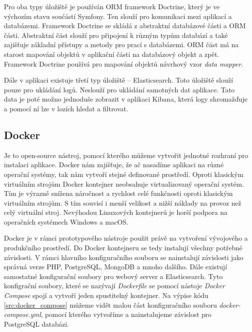 \documentclass[czech,master]{diploma}
\begin{document}
Pro oba typy úložiště je používán ORM framework Doctrine, který je ve výchozím stavu součástí Symfony. Ten slouží pro komunikaci mezi aplikací a databázemi. Framework Doctrine se skládá z abstraktní databázové části  a ORM části. Abstraktní část slouží pro připojení k různým typům databází a také zajišťuje základní přístupy a metody pro prací s databázemi. ORM část má na starost mapování objektů v aplikační části na databázový objekt a zpět. Framework Doctrine používá pro mapování objektů návrhový vzor \textit{data mapper}.


Dále v aplikaci existuje třetí typ úložiště -- Elasticsearch. Toto úložiště slouží pouze pro ukládání logů. Neslouží pro ukládání samotných dat aplikace. Tato data je poté možno jednoduše zobrazit v aplikaci Kibana, která logy shromažďuje a pomocí ní lze v lozích hledat a filtrovat.

\subsection{Docker}
\label{sec:docker}
Je to open-source nástroj, pomocí kterého můžeme vytvořit jednotné rozhraní pro instalaci aplikace. Docker nám zajišťuje, že ač nasadíme aplikaci na různé operační systémy, tak nám vytvoří stejné definované prostředí. Oproti klasickým virtuálním strojům Docker kontejner neobsahuje virtualizovaný operační systém. Tím je výrazně snížena náročnost a rychlost celé funkčnosti oproti klasickým virtuálním strojům. S tím souvisí i menší velikost a nižší náklady na provoz než celý virtuální stroj. Nevýhodou Linuxových kontejnerů je horší podpora na operačních systémech Windows a macOS.

Docker je v rámci prototypového nástroje použit právě na vytvoření vývojového a produkčního prostředí. Do Docker kontejneru se tedy instalují všechny potřebné závislosti. V rámci hlavního konfiguračního souboru se nainstalují závislosti jako správná verze PHP, PostgreSQL, MongoDB a mnoho dalšího. Dále existují samostatné konfigurační soubory pro webový server a Elasticsearch. Tyto konfigrační soubory, které se nazývají \textit{Dockerfile} se pomocí nástoje \textit{Docker Compose} spojí a vytvoří jeden spustitelný kontejner. Na výpise kódu \ref{src:docker_compose} můžeme vidět malou část konfiguračního souboru \textit{docker-compose.yml}, pomocí kterého vytvoříme a nainstalujeme závislost pro PostgreSQL databázi.


\end{document}

